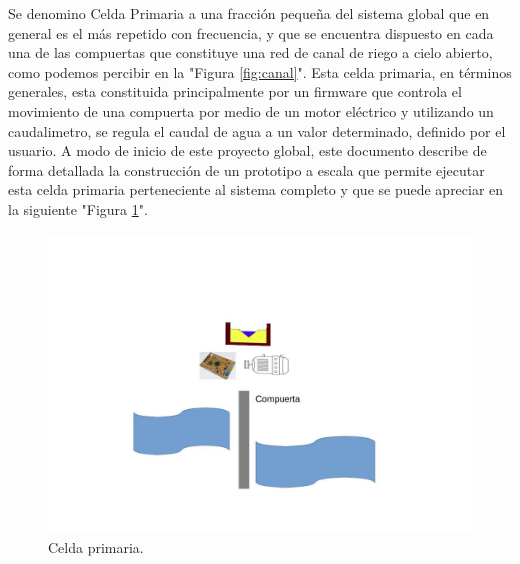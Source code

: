 Se denomino Celda Primaria a una fracción pequeña del sistema global que en general es el más repetido con frecuencia, y que se encuentra dispuesto en cada una de las compuertas que constituye una red de canal de riego a cielo abierto, como podemos percibir en la "Figura \ref{fig:canal}".
Esta celda primaria, en términos generales, esta constituida principalmente por un firmware que controla el movimiento de una compuerta por medio de un motor eléctrico y utilizando un caudalimetro, se regula el caudal de agua a un valor determinado, definido por el usuario.
A modo de inicio de este proyecto global, este documento describe de forma detallada la construcción de un prototipo a escala que permite ejecutar esta celda primaria perteneciente al sistema completo y que se puede apreciar  en la siguiente "Figura \ref{fig:SistemaBase}".
\begin{figure}[ht]
\centering
\includegraphics[scale=.40]{./Figures/SistemaBase-V2.jpg}
\caption{Celda primaria.}
\label{fig:SistemaBase}
\end{figure}


 
%
%


